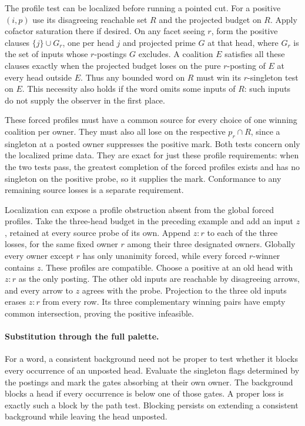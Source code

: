 The profile test can be localized before running a
pointed cut. For a positive $(i,p)$ use its disagreeing
reachable set $R$ and the projected budget on $R$.
Apply cofactor saturation there if desired. On any
facet seeing $r$, form the positive clauses
$\{j\}\cup G_r$, one per head $j$ and projected prime
$G$ at that head, where $G_r$ is the set of inputs
whose $r$-postings $G$ excludes. A coalition $E$
satisfies all these clauses exactly when the projected
budget loses on the pure $r$-posting of $E$ at every
head outside $E$. Thus any bounded word on $R$
must win its $r$-singleton test on $E$. This necessity
also holds if the word omits some inputs of $R$:
such inputs do not supply the observer in the
first place.

These forced profiles must have a common source
for every choice of one winning coalition per owner.
They must also all lose on the respective $p_r\cap R$,
since a singleton at a posted owner suppresses the
positive mark. Both tests concern only the localized
prime data. They are exact for just these profile
requirements: when the two tests pass, the greatest
completion of the forced profiles exists and has
no singleton on the positive probe, so it supplies
the mark. Conformance to any remaining source
losses is a separate requirement.

Localization can expose a profile obstruction absent
from the global forced profiles. Take the three-head
budget in the preceding example and add an input
$z$, retained at every source probe of its own.
Append $z:r$ to each of the three losses, for the
same fixed owner $r$ among their three designated
owners. Globally every owner except $r$ has only
unanimity forced, while every forced $r$-winner
contains $z$. These profiles are compatible.
Choose a positive at an old head with $z:r$ as the
only posting. The other old inputs are reachable
by disagreeing arrows, and every arrow to $z$
agrees with the probe. Projection to the three
old inputs erases $z:r$ from every row. Its three
complementary winning pairs have empty common
intersection, proving the positive infeasible.

\paragraph{Substitution through the full palette.}
For a word, a consistent background need not be proper
to test whether it blocks every occurrence of an unposted
head. Evaluate the singleton flags determined by the
postings and mark the gates absorbing at their own owner.
The background blocks a head if every occurrence is below
one of those gates. A proper loss is exactly such a block
by the path test. Blocking persists on extending a
consistent background while leaving the head unposted.

